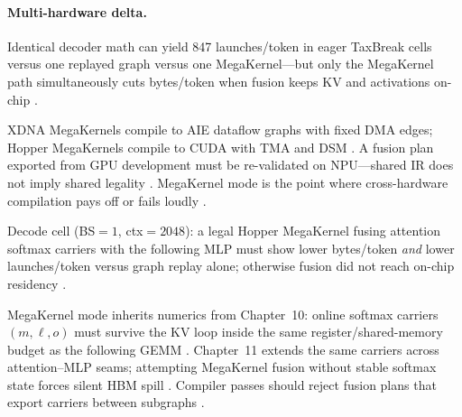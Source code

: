 \paragraph{Multi-hardware delta.} Identical decoder math can yield 847 launches/token in eager TaxBreak cells versus one replayed graph versus one MegaKernel---but only the MegaKernel path simultaneously cuts bytes/token when fusion keeps KV and activations on-chip \citep{taxbreak2026,nvidia2024cudagraphs,memoryfloor2026,yirage2026}.

XDNA MegaKernels compile to AIE dataflow graphs with fixed DMA edges; Hopper MegaKernels compile to CUDA with TMA and DSM \citep{amd2024xdna,amd2024aie,nvidia2022hopper,semianalysis2024tma,yirage2026,chen2020compilerbasedhardw}. A fusion plan exported from GPU development must be re-validated on NPU---shared IR does not imply shared legality \citep{yirage2026,chen2020compilerbasedhardw,patel2025llminference,amd2024xdna,taxbreak2026,memoryfloor2026,dlbook,kwon2023vllm,liu2024deepseekv3,dao2022flashattention,semianalysis2024tma,nvidia2022hopper,nvidia2024cudagraphs,dao2023flashdecoding,amd2024aie}. MegaKernel mode is the point where cross-hardware compilation pays off or fails loudly \citep{yirage2026,chen2020compilerbasedhardw,amd2024xdna,patel2025llminference,taxbreak2026,memoryfloor2026,dlbook,kwon2023vllm,liu2024deepseekv3,dao2022flashattention,amd2024aie,semianalysis2024tma,nvidia2022hopper,nvidia2024cudagraphs,dao2023flashdecoding}.

\begin{example}
Decode cell (BS${=}1$, ctx${=}2048$): a legal Hopper MegaKernel fusing attention softmax carriers with the following MLP must show lower bytes/token \emph{and} lower launches/token versus graph replay alone; otherwise fusion did not reach on-chip residency \citep{dao2022flashattention,memoryfloor2026,yirage2026}.
\end{example}

MegaKernel mode inherits numerics from Chapter~10: online softmax carriers $(m,\ell,o)$ must survive the KV loop inside the same register/shared-memory budget as the following GEMM \citep{dao2022flashattention,dao2023flashdecoding,yirage2026}. Chapter~11 extends the same carriers across attention--MLP seams; attempting MegaKernel fusion without stable softmax state forces silent HBM spill \citep{taxbreak2026,memoryfloor2026,semianalysis2024tma}. Compiler passes should reject fusion plans that export carriers between subgraphs \citep{yirage2026,chen2020compilerbasedhardw,amd2024aie}.

